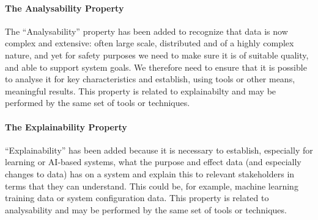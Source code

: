 \paragraph{The Analysability Property}\label{bkm:guidance:analysability}
The ``Analysability'' property has been added to recognize that data is now complex and extensive: often large scale, distributed and of a highly complex nature, and yet for safety purposes we need to make sure it is of suitable quality, and able to support system goals.
We therefore need to ensure that it is possible to analyse it for key characteristics and establish, using tools or other means, meaningful results. This property is related to explainabilty and may be performed by the same set of tools or techniques.

\paragraph{The Explainability Property}\label{bkm:guidance:explainability}
``Explainability'' has been added because it is necessary to establish, especially for learning or AI-based systems,
what the purpose and effect data (and especially changes to data) has on a system
and explain this to relevant stakeholders in terms that they can understand.
This could be, for example, machine learning training data or system configuration data.
This property is related to analysability and may be performed by the same set of tools or techniques.
%
\clearpage
